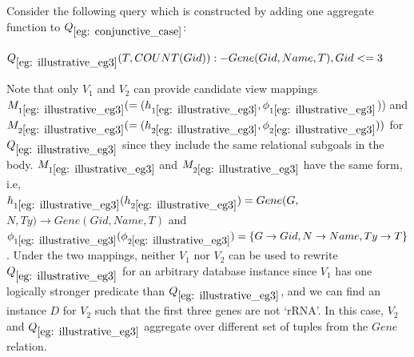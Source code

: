 \begin{example} \label{eg: illustrative_eg3}
Consider the following query which is constructed by adding one aggregate function to $Q_{\ref{eg: conjunctive_case}}$:
\begin{tabbing}
$Q_{\ref{eg: illustrative_eg3}}(T, COUNT(Gid)) :- Gene(Gid, Name, T), Gid <= 3$
\end{tabbing}
Note that only $V_1$ and $V_2$ can provide candidate view mappings $M_{1{\ref{eg: illustrative_eg3}}}(=(h_{1{\ref{eg: illustrative_eg3}}}, \phi_{1{\ref{eg: illustrative_eg3}}}$)) and $M_{2{\ref{eg: illustrative_eg3}}}(=(h_{2{\ref{eg: illustrative_eg3}}}, \phi_{2{\ref{eg: illustrative_eg3}}}))$ for $Q_{\ref{eg: illustrative_eg3}}$ since they include the same relational subgoals in the body. $M_{1{\ref{eg: illustrative_eg3}}}$ and $M_{2{\ref{eg: illustrative_eg3}}}$ have the same form, i.e, \\
$h_{1\ref{eg: illustrative_eg3}}(h_{2\ref{eg: illustrative_eg3}}) = Gene(G,$ $N, Ty) \rightarrow Gene(Gid, Name, T)$ and $\phi_{1\ref{eg: illustrative_eg3}} (\phi_{2\ref{eg: illustrative_eg3}}) = \{G\rightarrow Gid, N \rightarrow Name, Ty\rightarrow T\}$. Under the two mappings, neither $V_1$  nor $V_2$ can be used to rewrite $Q_{\ref{eg: illustrative_eg3}}$ for an arbitrary database instance since $V_1$ has one logically stronger predicate than $Q_{\ref{eg: illustrative_eg3}}$, and we can find an instance $D$ for $V_2$ such that the first three genes are not `rRNA'.  In this case, $V_2$ and $Q_{\ref{eg: illustrative_eg3}}$ aggregate over different set of tuples from the $Gene$ relation. 



\end{example}
